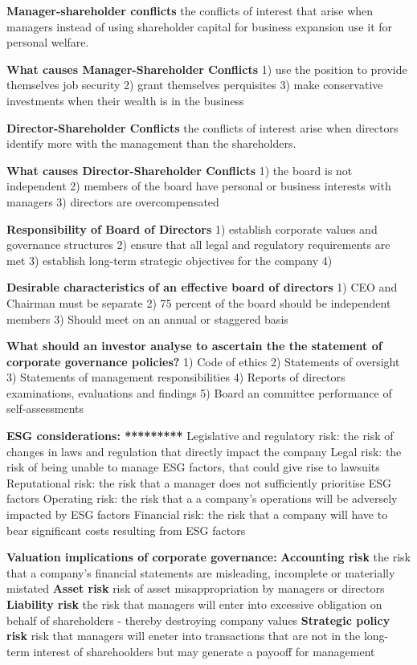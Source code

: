 \documentclass[12pt]{article}
\begin{document}
			\textbf{Manager-shareholder conflicts}
			the conflicts of interest that arise when managers instead of using shareholder capital for business expansion use it for personal welfare. 
			
			\textbf{What causes Manager-Shareholder Conflicts}
			1) use the position to provide themselves job security
			2) grant themselves perquisites
			3) make conservative investments when their wealth is in the business
			
			\textbf{Director-Shareholder Conflicts}
			the conflicts of interest arise when directors identify more with the management than the shareholders. 
			
			\textbf{What causes Director-Shareholder Conflicts}
			1) the board is not independent
			2) members of the board have personal or business interests with managers
			3) directors are overcompensated
			
			\textbf{Responsibility of Board of Directors}
			1) establish corporate values and governance structures
			2) ensure that all legal and regulatory requirements are met 
			3) establish long-term strategic objectives for the company
			4) 
			
			\textbf{Desirable characteristics of an effective board of directors}
			1) CEO and Chairman must be separate
			2) 75 percent of the board should be independent members
			3) Should meet on an annual or staggered basis
			
			
			\textbf{What should an investor analyse to ascertain the the statement of corporate governance policies?}
			1) Code of ethics
			2) Statements of oversight
			3) Statements of management responsibilities
			4) Reports of directors examinations, evaluations and findings
			5) Board an committee performance of self-assessments
			
			\textbf{ESG considerations: *********}
			{Legislative and regulatory risk:} the risk of changes in laws and regulation that directly impact the company
			{Legal risk:} the risk of being unable to manage ESG factors, that could give rise to lawsuits
			{Reputational risk:} the risk that a manager does not sufficiently prioritise ESG factors
			{Operating risk:} the risk that a a company's operations will be adversely impacted by ESG factors
			{Financial risk:} the risk that a company will have to bear significant costs resulting from ESG factors
			
			\textbf{Valuation implications of corporate governance:}
			\textbf{Accounting risk} the risk that a company's financial statements are misleading, incomplete or materially mistated
			\textbf{Asset risk} risk of asset misappropriation by managers or directors
			\textbf{Liability risk} the risk that managers will enter into excessive obligation on behalf of shareholders - thereby destroying company values
			\textbf{Strategic policy risk} risk that managers will eneter into transactions that are not in the long-term interest of sharehoolders but may generate a payooff for management
			
\end{document}
